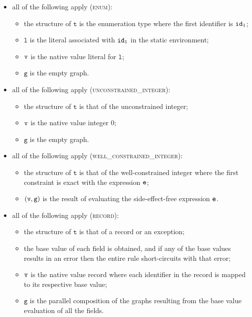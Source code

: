 \documentclass{book}
\newcommand\vg[0]{\texttt{g}}
\newcommand\vl[0]{\texttt{l}}
\newcommand\vt[0]{\texttt{t}}
\begin{document}
\begin{itemize}
  \item all of the following apply (\textsc{enum}):
  \begin{itemize}
    \item the structure of $\vt$ is the enumeration type where the first identifier is $\texttt{id}_1$;
    \item $\vl$ is the literal associated with $\texttt{id}_1$ in the static environment;
    \item $\texttt{v}$ is the native value literal for $\vl$;
    \item $\vg$ is the empty graph.
  \end{itemize}

  \item all of the following apply (\textsc{unconstrained\_integer}):
  \begin{itemize}
    \item the structure of $\vt$ is that of the unconstrained integer;
    \item $\texttt{v}$ is the native value integer $0$;
    \item $\vg$ is the empty graph.
  \end{itemize}

  \item all of the following apply (\textsc{well\_constrained\_integer}):
  \begin{itemize}
    \item the structure of $\vt$ is that of the well-constrained integer where the first constraint
    is exact with the expression $\texttt{e}$;
    \item $(\vv, \vg)$ is the result of evaluating the side-effect-free expression $\texttt{e}$.
  \end{itemize}

  \item all of the following apply (\textsc{record}):
  \begin{itemize}
    \item the structure of $\vt$ is that of a record or an exception;
    \item the base value of each field is obtained, and if any of the base values results in an error
    then the entire rule short-circuits with that error;
    \item $\texttt{v}$ is the native value record where each identifier in the record is mapped to its
    respective base value;
    \item $\vg$ is the parallel composition of the graphs resulting from the base value evaluation
    of all the fields.
  \end{itemize}


\end{itemize}
\end{document}

